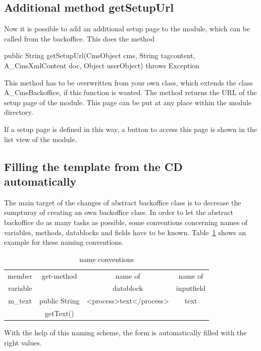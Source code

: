 \subsection{Additional method getSetupUrl}
Now it is possible to add an additional setup page to the module, which can be
called from the backoffice. This does the method

\begin{java}
public String getSetupUrl(CmsObject cms, String tagcontent, A\_CmsXmlContent doc, 
Object userObject) throws Exception
\end{java}

This method has to be overwritten from your own class, which extends the class
{\name A\_CmsBackoffice}, if this function is wanted. The method returns the URL 
of the setup page of the module. This page can be put at any place within the module
directory.

If a setup page is defined in this way, a button to access this page is shown in 
the list view of the module.

\subsection{Filling the template from the CD automatically}
The main target of the changes of abstract backoffice class is to decrease the
sumpturay of creating an own backoffice class. In order to let the abstract backoffice
do as many tasks as possible, some conventions concerning names of variables, methods,
datablocks and fields have to be known.
Table~\ref{nameConv} shows an example for these naming conventions.

\begin{table}
\begin{center}
\begin{tabular}{|c|c|c|c|}
\hline
member &
get-method&
name of&  
name of \\
variable&
&
datablock&
inputfield\\ \hline  
m\_text&
public String&
<process>text</process>&
text\\
&
getText()&
&  \\ \hline
\end{tabular}
\caption[name conventions]{name conventions}
\label{nameConv}
\end{center} 
\end{table}

With the help of this naming scheme, the form is automatically filled with the right
values.

